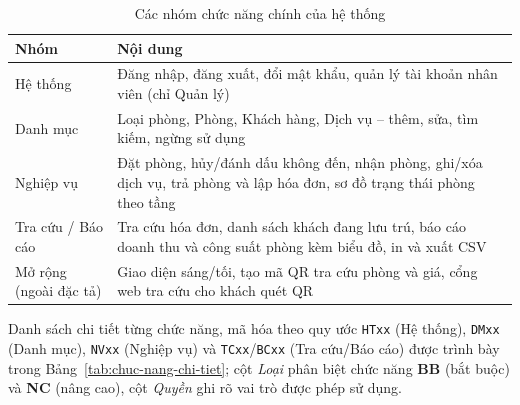 \documentclass[14pt]{report}
\begin{document}
\begin{table}[H]
\centering
\caption{Các nhóm chức năng chính của hệ thống}
\label{tab:nhom-chuc-nang}
\begin{tabularx}{\textwidth}{|l|X|}
\hline
\textbf{Nhóm} & \textbf{Nội dung} \\\hline
Hệ thống & Đăng nhập, đăng xuất, đổi mật khẩu, quản lý tài khoản nhân viên (chỉ Quản lý) \\\hline
Danh mục & Loại phòng, Phòng, Khách hàng, Dịch vụ -- thêm, sửa, tìm kiếm, ngừng sử dụng \\\hline
Nghiệp vụ & Đặt phòng, hủy/đánh dấu không đến, nhận phòng, ghi/xóa dịch vụ, trả phòng và lập hóa đơn, sơ đồ trạng thái phòng theo tầng \\\hline
Tra cứu / Báo cáo & Tra cứu hóa đơn, danh sách khách đang lưu trú, báo cáo doanh thu và công suất phòng kèm biểu đồ, in và xuất CSV \\\hline
Mở rộng (ngoài đặc tả) & Giao diện sáng/tối, tạo mã QR tra cứu phòng và giá, cổng web tra cứu cho khách quét QR \\\hline
\end{tabularx}
\end{table}

Danh sách chi tiết từng chức năng, mã hóa theo quy ước \texttt{HTxx} (Hệ thống), \texttt{DMxx} (Danh mục), \texttt{NVxx} (Nghiệp vụ) và \texttt{TCxx}/\texttt{BCxx} (Tra cứu/Báo cáo) được trình bày trong Bảng~\ref{tab:chuc-nang-chi-tiet}; cột \textit{Loại} phân biệt chức năng \textbf{BB} (bắt buộc) và \textbf{NC} (nâng cao), cột \textit{Quyền} ghi rõ vai trò được phép sử dụng.
\end{document}

